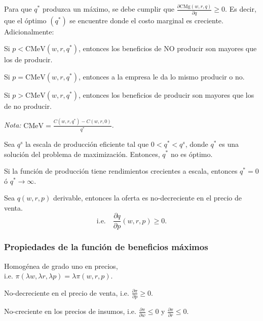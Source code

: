 \documentclass[8pt,a4paper]{extarticle}
\begin{document}
\begin{multicols}{3}
	Para que $q^*$ produzca un máximo, se debe cumplir que $\displaystyle \frac{\partial \text{CMg} (w, r, q)}{\partial q} \ge 0$. Es decir, que el óptimo $(q^*)$ se encuentre donde el costo marginal es creciente. Adicionalmente:

	\begin{eqlist}
		\item Si $p < \text{CMeV} (w, r, q^*)$, entonces los beneficios de NO producir son mayores que los de producir.
		\item Si $p = \text{CMeV} (w, r, q^*)$, entonces a la empresa le da lo mismo producir o no.
		\item Si $p > \text{CMeV} (w, r, q^*)$, entonces los beneficios de producir son mayores que los de no producir.
	\end{eqlist}

	\textit{Nota:} $\displaystyle \text{CMeV} = \frac{C(w, r, q^*) - C(w, r, 0)}{q^*}$.

	\sectionbreak

	\begin{boxprop}
		Sea $q^s$ la escala de producción eficiente tal que $0 < q^* < q^s$, donde $q^*$ es una solución del problema de maximización. Entonces, $q^*$ no es óptimo.
	\end{boxprop}

	\begin{boxprop}
		Si la función de producción tiene rendimientos crecientes a escala, entonces $q^* = 0$ ó $q^* \to \infty$.
	\end{boxprop}

	\begin{boxtheo}
		Sea $q(w, r, p)$ derivable, entonces la oferta es no-decreciente en el precio de venta.
		\[
			\text{i.e.}\quad \frac{\partial q}{\partial p} (w, r, p) \ge 0
			.\]
	\end{boxtheo}

	\subsubsection{Propiedades de la función de beneficios máximos}

	\begin{eqlist}
		\item Homogénea de grado uno en precios, \\ i.e. $\pi (\lambda w, \lambda r, \lambda p) = \lambda \pi(w, r, p)$.
		\item No-decreciente en el precio de venta, i.e. $\displaystyle \frac{\partial \pi}{\partial p} \ge 0$.
		\item No-creciente en los precios de insumos, i.e. $\displaystyle \frac{\partial \pi}{\partial w} \le 0$ y $\displaystyle \frac{\partial \pi}{\partial r} \le 0$.
	\end{eqlist}


\end{multicols}
\end{document}
